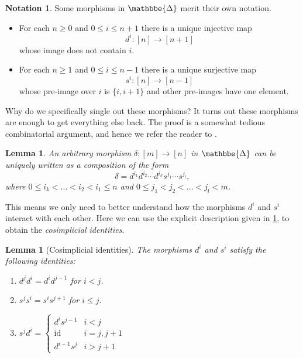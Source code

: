 \documentclass[11pt, a4paper]{amsart}
\def\DDelta{{\mathbbe{\Delta}}}
\newcommand{\DD}{\DDelta}
\newcommand{\id}{\mathrm{id}}
\newtheorem{lemma}[equation]{Lemma}
\theoremstyle{definition}
\newtheorem{notation}[equation]{Notation}
\theoremstyle{remark}
\numberwithin{equation}{section}
\begin{document}
\begin{notation} \label{not:di si}
  Some morphisms in $\DD$ merit their own notation. 
 \begin{itemize}[leftmargin=*]
  \item For each $n \geq 0$ and $0 \leq i \leq n+1$ there is a unique injective map 
  \[d^i\colon[n] \to [n+1]\]
  whose image does not contain $i$.
  \item For each $n \geq 1$ and $0 \leq i \leq n-1$ there is a unique surjective map 
  \[s^i\colon[n] \to [n-1]\]
  whose pre-image over $i$ is $\{i,i+1\}$ and other pre-images have one element. 
 \end{itemize}
\end{notation}

Why do we specifically single out these morphisms? It turns out these morphisms are enough to get everything else back. The proof is a somewhat tedious combinatorial argument, and hence we refer the reader to \cite[Section VII.5]{maclane1998categories}.
\begin{lemma} \label{lemma:delta unique}
  An arbitrary morphism $\delta\colon [m] \to [n]$ in $\DD$ can be uniquely written as a composition of the form 
  \[\delta = d^{i_1}d^{i_2}\cdots d^{i_k}s^{j_1}\cdots s^{j_l},\]
  where $0 \leq i_k < \dots < i_2 < i_1 \leq n$ and $0 \leq j_1 < j_2 < \dots < j_l < m$.
\end{lemma}

This means we only need to better understand how the morphisms $d^i$ and $s^i$ interact with each other. Here we can use the explicit description given in \cref{not:di si}, to obtain the \emph{cosimplicial identities}.

\begin{lemma}[Cosimplicial identities] \label{lemma:cosimplicial identities}
 The morphisms $d^i$ and $s^i$ satisfy the following identities:
\begin{enumerate}
  \item $d^j d^i = d^i d^{j-1}$ for $i < j$.
  \item $s^j s^i = s^i s^{j+1}$ for $i \leq j$.
  \item $s^j d^i = \begin{cases}
    d^i s^{j-1} & i < j \\
    \id & i = j, j+1 \\
    d^{i-1} s^j & i > j + 1
  \end{cases}$
\end{enumerate}
\end{lemma}
\end{document}
